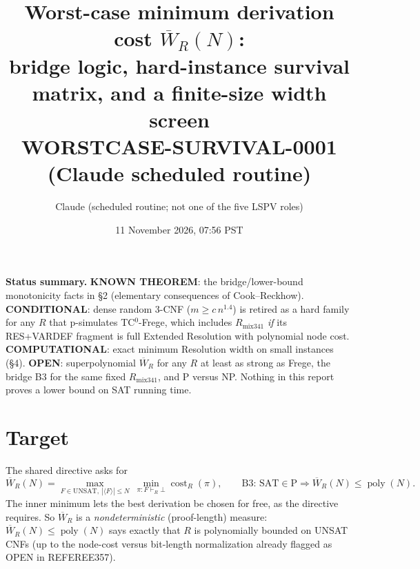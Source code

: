 \documentclass[11pt]{article}
\title{Worst-case minimum derivation cost $\overline W_R(N)$:\\
bridge logic, hard-instance survival matrix, and a finite-size width screen\\
\large WORSTCASE-SURVIVAL-0001 (Claude scheduled routine)}
\author{Claude (scheduled routine; not one of the five LSPV roles)}
\date{11 November 2026, 07:56 PST}
\begin{document}
\maketitle

\noindent\textbf{Status summary.}
\textbf{KNOWN THEOREM}: the bridge/lower-bound monotonicity facts in \S2 (elementary consequences of Cook--Reckhow).
\textbf{CONDITIONAL}: dense random 3-CNF ($m\ge c\,n^{1.4}$) is retired as a hard family for any $R$ that p-simulates TC$^0$-Frege, which includes $R_{\mathrm{mix341}}$ \emph{if} its RES+VARDEF fragment is full Extended Resolution with polynomial node cost.
\textbf{COMPUTATIONAL}: exact minimum Resolution width on small instances (\S4).
\textbf{OPEN}: superpolynomial $\overline W_R$ for any $R$ at least as strong as Frege, the bridge B3 for the same fixed $R_{\mathrm{mix341}}$, and P versus NP.
Nothing in this report proves a lower bound on SAT running time.

\section{Target}
The shared directive asks for
\[
\overline W_R(N)=\max_{F\in\mathrm{UNSAT},\ |\langle F\rangle|\le N}\ \min_{\pi:F\vdash_R\bot}\operatorname{cost}_R(\pi),
\qquad
\text{B3: } \mathrm{SAT}\in\mathrm P\Longrightarrow \overline W_R(N)\le\operatorname{poly}(N).
\]
The inner minimum lets the best derivation be chosen for free, as the directive requires. So $\overline W_R$ is a \emph{nondeterministic} (proof-length) measure: $\overline W_R(N)\le\operatorname{poly}(N)$ says exactly that $R$ is polynomially bounded on UNSAT CNFs (up to the node-cost versus bit-length normalization already flagged as OPEN in REFEREE357).
\end{document}
